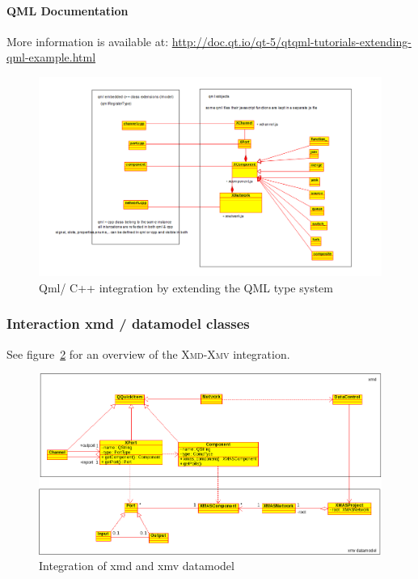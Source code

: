\paragraph{QML Documentation}
More information is available at:
\url{http://doc.qt.io/qt-5/qtqml-tutorials-extending-qml-example.html}

\begin{figure}
    \includegraphics[width=\textwidth]{qml-cpp-extension}
    \caption{Qml/ C++ integration by extending the QML type system}
    \label{fig:qml-cpp-classes}
\end{figure}

\subsubsection{Interaction xmd / datamodel classes}

See figure~\ref{fig:xmd-xmv-integration} for an overview of the 
\textsc{Xmd-Xmv} integration.

\begin{figure}
    \includegraphics[width=\textwidth]{xmd-xmv-integration}
    \caption{Integration of xmd and xmv datamodel}
    \label{fig:xmd-xmv-integration}
\end{figure}

